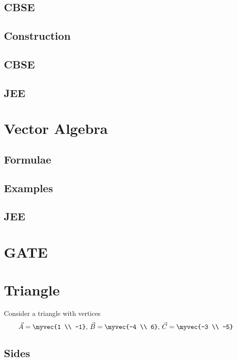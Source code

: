 \documentclass[journal]{IEEEtran}
\begin{document}
\subsection{CBSE}

\subsection{Construction}

\subsection{CBSE}

\subsection{JEE}
 
%
\newpage
\section{Vector Algebra}
\subsection{Formulae}

\subsection{Examples}

\subsection{JEE}
 
\newpage
\section{GATE}

\newpage
\appendices
\section{Triangle}
Consider a triangle with vertices
		\begin{align}
			\label{eq:app-tri-pts}
			\vec{A} = \myvec{1 \\ -1},\,
			\vec{B} = \myvec{-4 \\ 6},\,
			\vec{C} = \myvec{-3 \\ -5}
		\end{align}
\subsection{Sides}

\end{document}
